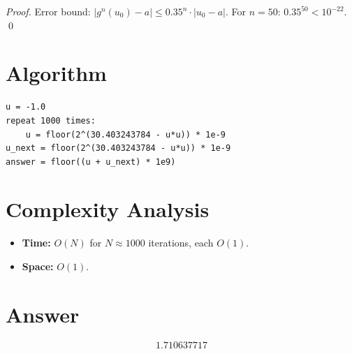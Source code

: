 \documentclass[12pt]{article}
\begin{document}
\begin{proof}
Error bound: $|g^n(u_0) - a| \leq 0.35^n \cdot |u_0 - a|$. For $n = 50$: $0.35^{50} < 10^{-22}$. \qed
\end{proof}

\section{Algorithm}

\begin{verbatim}
u = -1.0
repeat 1000 times:
    u = floor(2^(30.403243784 - u*u)) * 1e-9
u_next = floor(2^(30.403243784 - u*u)) * 1e-9
answer = floor((u + u_next) * 1e9)
\end{verbatim}

\section{Complexity Analysis}

\begin{itemize}
    \item \textbf{Time:} $O(N)$ for $N \approx 1000$ iterations, each $O(1)$.
    \item \textbf{Space:} $O(1)$.
\end{itemize}

\section{Answer}

\[
\boxed{1.710637717}
\]
\end{document}
